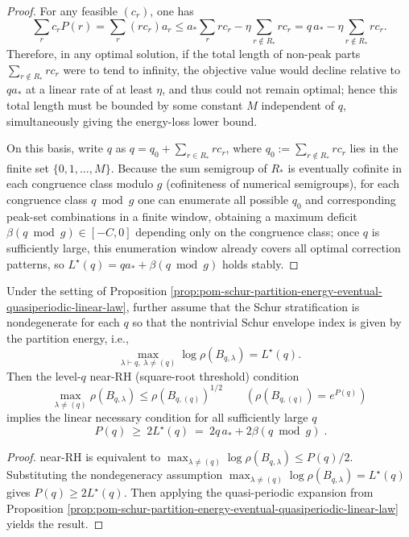 \begin{proof}
For any feasible \((c_r)\), one has
\[
\sum_r c_r P(r)=\sum_r (r c_r)a_r
\le a_*\sum_r r c_r-\eta\sum_{r\notin R_*}r c_r
=q\,a_*-\eta\sum_{r\notin R_*}r c_r.
\]
Therefore, in any optimal solution, if the total length of non-peak parts \(\sum_{r\notin R_*}r c_r\) were to tend to infinity, the objective value would decline relative to \(q a_*\) at a linear rate of at least \(\eta\), and thus could not remain optimal;
hence this total length must be bounded by some constant \(M\) independent of \(q\), simultaneously giving the energy-loss lower bound.
\par
On this basis, write \(q\) as
\(
q=q_0+\sum_{r\in R_*} r c_r
\), where \(q_0:=\sum_{r\notin R_*} r c_r\) lies in the finite set \(\{0,1,\dots,M\}\).
Because the sum semigroup of \(R_*\) is eventually cofinite in each congruence class modulo \(g\) (cofiniteness of numerical semigroups),
for each congruence class \(q\bmod g\) one can enumerate all possible \(q_0\) and corresponding peak-set combinations in a finite window, obtaining a maximum deficit
\(
\beta(q\bmod g)\in[-C,0]
\)
depending only on the congruence class;
once \(q\) is sufficiently large, this enumeration window already covers all optimal correction patterns, so \(L^\star(q)=q a_*+\beta(q\bmod g)\) holds stably.
\end{proof}
\begin{corollary}\label{cor:pom-schur-near-rh-linear-necessary-quasiperiodic}
Under the setting of Proposition \ref{prop:pom-schur-partition-energy-eventual-quasiperiodic-linear-law},
further assume that the Schur stratification is nondegenerate for each \(q\) so that the nontrivial Schur envelope index is given by the partition energy, i.e.,
\[
\max_{\lambda\vdash q,\ \lambda\neq(q)}\log\rho(B_{q,\lambda})=L^\star(q).
\]
Then the level-\(q\) near-RH (square-root threshold) condition
\[
\max_{\lambda\neq(q)}\rho(B_{q,\lambda})\le \rho(B_{q,(q)})^{1/2}
\qquad(\rho(B_{q,(q)})=e^{P(q)})
\]
implies the linear necessary condition for all sufficiently large \(q\)
\[
\boxed{\;
P(q)\ \ge\ 2L^\star(q)\ =\ 2q\,a_*+2\beta(q\bmod g)\; }.
\]
\end{corollary}
\begin{proof}
near-RH is equivalent to
\(
\max_{\lambda\neq(q)}\log\rho(B_{q,\lambda})\le P(q)/2
\).
Substituting the nondegeneracy assumption \(\max_{\lambda\neq(q)}\log\rho(B_{q,\lambda})=L^\star(q)\) gives \(P(q)\ge 2L^\star(q)\).
Then applying the quasi-periodic expansion from Proposition \ref{prop:pom-schur-partition-energy-eventual-quasiperiodic-linear-law} yields the result.
\end{proof}


